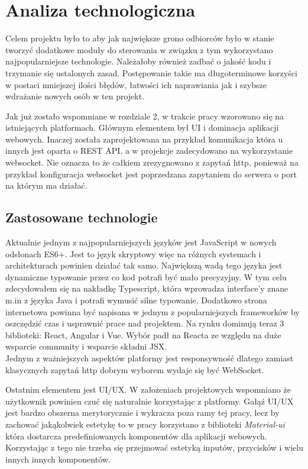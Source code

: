 \chapter{Analiza technologiczna}
Celem projektu było to aby jak największe grono odbiorców było w stanie tworzyć dodatkowe moduły do sterowania w związku z tym wykorzystano najpopularniejsze technologie. Należałoby również zadbać o jakość kodu i trzymanie się ustalonych zasad. Postępowanie takie ma długoterminowe korzyści w postaci mniejszej ilości błędów, łatwości ich naprawiania jak i szybsze wdrażanie nowych osób w ten projekt. 
\par Jak już zostało wspomniane w rozdziale 2, w trakcie pracy wzorowano się na istniejących platformach. Głównym elementem był UI i dominacja aplikacji webowych. Inaczej została zaprojektowana na przykład komunikacja która u innych jest oparta o REST API, a w projekcje zadecydowano na wykorzystanie websocket. Nie oznacza to że całkiem zrezygnowano z zapytań http, ponieważ na przykład konfiguracja websocket jest poprzedzana zapytaniem do serwera o port na którym ma działać.
\section{Zastosowane technologie}
Aktualnie jednym z najpopularniejszych języków jest JavaScript w nowych odsłonach ES6+. Jest to język skryptowy więc na różnych systemach i architekturach powinien działać tak samo. Największą wadą tego języka jest dynamiczne typowanie przez co kod potrafi być mało precyzyjny. W tym celu zdecydowałem się na nakładkę Typescript, która wprowadza interface'y znane m.in z języka Java i potrafi wymusić silne typowanie. Dodatkowo strona internetowa powinna być napisana w jednym z popularniejszych frameworków by oszczędzić czas i usprawnić prace nad projektem. Na rynku dominują teraz 3 biblioteki: React, Angular i Vue. Wybór padł na Reacta ze względu na duże wsparcie community i wsparcie składni JSX. \\
Jednym z ważniejszych aspektów platformy jest responsywność dlatego zamiast klasycznych zapytań http dobrym wyborem wydaje się być WebSocket. \cite{javascript}
\par Ostatnim elementem jest UI/UX. W założeniach projektowych wspomniano że użytkownik powinien czuć się naturalnie korzystając z platformy. Gałąź UI/UX jest bardzo obszerna merytorycznie i wykracza poza ramy tej pracy, lecz by zachować jakąkolwiek estetykę to w pracy korzystano z biblioteki \textit{Material-ui} która dostarcza predefiniowanych komponentów dla aplikacji webowych. Korzystając z tego nie trzeba się przejmować estetyką inputów, przycisków i wielu innych innych komponentów. \cite{materialui}
